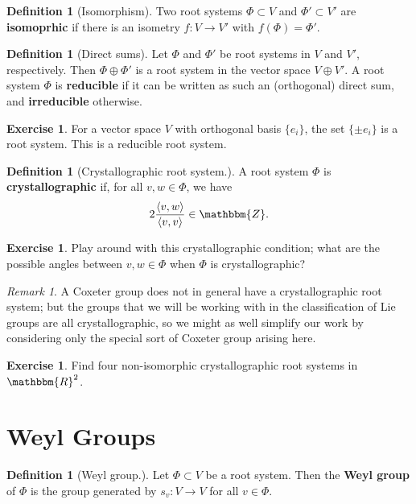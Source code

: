 \documentclass[12pt]{article}
\theoremstyle{remark}
\newtheorem{remark}[thm]{Remark}
\theoremstyle{definition}
\newtheorem{defn}[thm]{Definition}
\newtheorem{exercise}[thm]{Exercise}
\newcommand{\defnword}[1]{\textbf{#1}}
\newcommand{\R}{\mathbbm{R}}
\newcommand{\Z}{\mathbbm{Z}}
\begin{document}
\begin{defn}[Isomorphism]
Two root
systems $\Phi \subset V$ and $\Phi' \subset V'$ are
\defnword{isomoprhic} if there is an isometry $f : V \to V'$ with
$f(\Phi) = \Phi'$.
\end{defn}

\begin{defn}[Direct sums]
Let $\Phi$ and $\Phi'$ be root systems in $V$ and $V'$, respectively.
Then $\Phi \oplus \Phi'$ is a root system in the vector space $V
\oplus V'$.  A root system $\Phi$ is \defnword{reducible} if it can be
written as such an (orthogonal) direct sum, and \defnword{irreducible}
otherwise.
\end{defn}

\begin{exercise}
For a vector space $V$ with orthogonal basis $\{ e_i \}$, the set $\{
\pm e_i \}$ is a root system.  This is a reducible root system.
\end{exercise}

\begin{defn}[Crystallographic root system.]
A root system $\Phi$ is \defnword{crystallographic} if, for all $v,
w \in \Phi$, we have
$$
2 \frac{\langle v, w \rangle}{\langle v, v \rangle} \in \Z.
$$
\end{defn}

\begin{exercise}
Play around with this crystallographic condition; what are the
possible angles between $v, w \in \Phi$ when $\Phi$ is
crystallographic?
\end{exercise}

\begin{remark}
A Coxeter group does not in general have a crystallographic root
system; but the groups that we will be working with in the
classification of Lie groups are all crystallographic, so we might as
well simplify our work by considering only the special sort of Coxeter
group arising here.
\end{remark}

\begin{exercise}
Find four non-isomorphic crystallographic root systems in $\R^2$.
\end{exercise}

\section{Weyl Groups}

\begin{defn}[Weyl group.]
Let $\Phi \subset V$ be a root system.  Then the \defnword{Weyl
group} of $\Phi$ is the group generated by $s_v : V \to V$ for all
$v \in \Phi$.
\end{defn}
\end{document}
